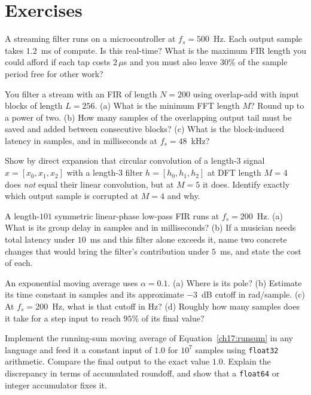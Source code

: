 \section{Exercises}
\label{ch17:exercises}

\begin{exercise}
A streaming filter runs on a microcontroller at $f_s = 500$~Hz. Each output
sample takes $1.2$~ms of compute. Is this real-time? What is the maximum FIR
length you could afford if each tap costs $2\,\mu$s and you must also leave
$30\%$ of the sample period free for other work?
\end{exercise}

\begin{exercise}
You filter a stream with an FIR of length $N = 200$ using overlap-add with input
blocks of length $L = 256$. (a) What is the minimum FFT length $M$? Round up to a
power of two. (b) How many samples of the overlapping output tail must be saved
and added between consecutive blocks? (c) What is the block-induced latency in
samples, and in milliseconds at $f_s = 48$~kHz?
\end{exercise}

\begin{exercise}
Show by direct expansion that circular convolution of a length-$3$ signal
$x = [x_0,x_1,x_2]$ with a length-$3$ filter $h=[h_0,h_1,h_2]$ at DFT length
$M=4$ does \emph{not} equal their linear convolution, but at $M=5$ it does.
Identify exactly which output sample is corrupted at $M=4$ and why.
\end{exercise}

\begin{exercise}
A length-$101$ symmetric linear-phase low-pass FIR runs at $f_s = 200$~Hz.
(a) What is its group delay in samples and in milliseconds? (b) If a musician
needs total latency under $10$~ms and this filter alone exceeds it, name two
concrete changes that would bring the filter's contribution under $5$~ms, and
state the cost of each.
\end{exercise}

\begin{exercise}
An exponential moving average uses $\alpha = 0.1$. (a) Where is its pole?
(b) Estimate its time constant in samples and its approximate $-3$~dB cutoff in
rad/sample. (c) At $f_s = 200$~Hz, what is that cutoff in Hz? (d) Roughly how many
samples does it take for a step input to reach $95\%$ of its final value?
\end{exercise}

\begin{exercise}
Implement the running-sum moving average of Equation~\eqref{ch17:runsum} in any
language and feed it a constant input of $1.0$ for $10^7$ samples using
\texttt{float32} arithmetic. Compare the final output to the exact value $1.0$.
Explain the discrepancy in terms of accumulated roundoff, and show that a
\texttt{float64} or integer accumulator fixes it.
\end{exercise}

